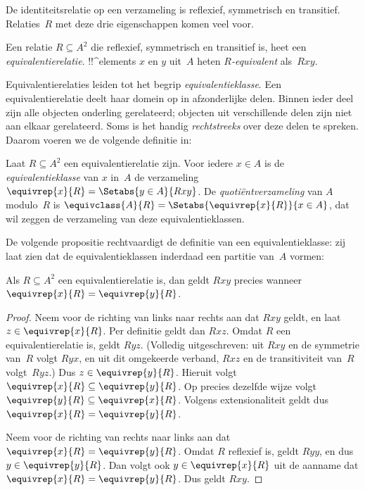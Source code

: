 \documentclass[../../../include/open-logic-section]{subfiles}
\begin{document}


De identiteitsrelatie op een verzameling is reflexief, symmetrisch en
transitief. Relaties~$R$ met deze drie eigenschappen komen veel voor.

\begin{defn}[Equivalentierelatie] 
Een relatie $R \subseteq A^2$ die reflexief, symmetrisch en
transitief is, heet een \emph{equivalentierelatie}. !!^{element}s $x$
en $y$ uit~$A$ heten \emph{$R$-equivalent} als~$Rxy$.
\end{defn}

Equivalentierelaties leiden tot het begrip \emph{equivalentieklasse}.
Een equivalentierelatie deelt haar domein op in afzonderlijke delen.
Binnen ieder deel zijn alle objecten onderling gerelateerd; objecten
uit verschillende delen zijn niet aan elkaar gerelateerd. Soms is het
handig \emph{rechtstreeks} over deze delen te spreken. Daarom voeren
we de volgende definitie in:

\begin{defn}
Laat $R \subseteq A^2$ een equivalentierelatie zijn. Voor iedere $x \in A$
is de \emph{equivalentieklasse} van $x$ in~$A$ de verzameling $\equivrep{x}{R}
= \Setabs{y \in A}{Rxy}$. De \emph{quotiëntverzameling} van $A$ modulo~$R$ is
$\equivclass{A}{R} = \Setabs{\equivrep{x}{R}}{x \in A}$, dat wil zeggen de
verzameling van deze equivalentieklassen. 
\end{defn}

De volgende propositie rechtvaardigt de definitie van een
equivalentieklasse: zij laat zien dat de equivalentieklassen inderdaad
een partitie van~$A$ vormen:

\begin{prop}
Als $R \subseteq A^2$ een equivalentierelatie is, dan geldt $Rxy$ precies wanneer
$\equivrep{x}{R} = \equivrep{y}{R}$.
\end{prop}

\begin{proof}
Neem voor de richting van links naar rechts aan dat $Rxy$ geldt, en laat $z \in
\equivrep{x}{R}$. Per definitie geldt dan $Rxz$. Omdat $R$ een
equivalentierelatie is, geldt $Ryz$. (Volledig uitgeschreven: uit $Rxy$
en de symmetrie van~$R$ volgt $Ryx$, en uit dit omgekeerde verband,
$Rxz$ en de transitiviteit van~$R$ volgt~$Ryz$.) Dus $z \in
\equivrep{y}{R}$.
Hieruit volgt $\equivrep{x}{R} \subseteq \equivrep{y}{R}$. Op precies
dezelfde wijze volgt $\equivrep{y}{R} \subseteq \equivrep{x}{R}$.
Volgens extensionaliteit geldt dus $\equivrep{x}{R} =
\equivrep{y}{R}$.

Neem voor de richting van rechts naar links aan dat $\equivrep{x}{R} =
\equivrep{y}{R}$. Omdat $R$ reflexief is, geldt $Ryy$, en dus $y \in
\equivrep{y}{R}$. Dan volgt ook $y \in \equivrep{x}{R}$ uit de aanname
dat $\equivrep{x}{R} = \equivrep{y}{R}$. Dus geldt $Rxy$.
\end{proof}
\end{document}

